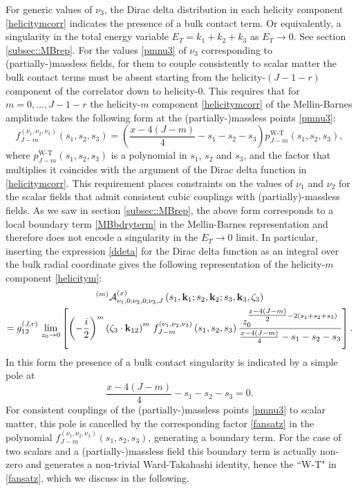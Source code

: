 \documentclass[11pt,a4paper]{article}
\begin{document}
For generic values of $\nu_3$, the Dirac delta distribution in each helicity component \eqref{helicitymcorr} indicates the presence of a bulk contact term. Or equivalently, a singularity in the total energy variable $E_T = k_1+k_2+k_3$ as $E_T \to 0$. See section \ref{subsec::MBrep}. For the values \eqref{pmnu3} of $\nu_3$ corresponding to (partially-)massless fields, for them to couple consistently to scalar matter the bulk contact terms must be absent starting from the helicity-$\left(J-1-r\right)$ component of the correlator down to helicity-$0$. This requires that for $m=0,\ldots,J-1-r$ the helicity-$m$ component \eqref{helicitymcorr} of the Mellin-Barnes amplitude takes the following form at the (partially-)massless points \eqref{pmnu3}:
\begin{equation}\label{fansatz}
  f^{\left(\nu_1,\nu_2,\nu_3\right)}_{J-m}\left(s_1,s_2,s_3\right)=  \left(\frac{x-4\left(J-m\right)}{4}-s_1-s_2-s_3\right)p^{\text{W-T}}_{J-m}\left(s_1,s_2,s_3\right),
\end{equation}
 where $p^{\text{W-T}}_{J-m}\left(s_1,s_2,s_3\right)$ is a polynomial in $s_1$, $s_2$ and $s_3$, and the factor that multiplies it coincides with the argument of the Dirac delta function in \eqref{helicitymcorr}. This requirement places constraints on the values of $\nu_1$ and $\nu_2$ for the scalar fields that admit consistent cubic couplings with (partially)-massless fields. As we saw in section \ref{subsec::MBrep}, the above form corresponds to a local boundary term \eqref{MBbdryterm} in the Mellin-Barnes representation and therefore does not encode a singularity in the $E_T \to 0$ limit. In particular, inserting the expression \eqref{ddeta} for the Dirac delta function as an integral over the bulk radial coordinate gives the following representation of the helicity-$m$ component \eqref{helicitym}:
 \begin{multline}\label{helmeta}
     {}^{\left(m\right)}{\cal A}^{\left(x\right)}_{\nu_1,0;\nu_2,0;\nu_3,J}\left(s_1,{\bf k}_1;s_2,{\bf k}_2;s_3,{\bf k}_3,\zeta_3\right) \\ = g^{\left(J, r\right)}_{12}\,\lim_{z_0 \to 0}\left[ \left(-\frac{i}{2}\right)^m \left(\zeta_3 \cdot {\bf k}_{12}\right)^m\,f^{\left(\nu_1,\nu_2,\nu_3\right)}_{J-m}\left(s_1,s_2,s_3\right) \frac{z_0^{\tfrac{x-4\left(J-m\right)}{2}-2\left(s_1+s_2+s_3\right)}}{\tfrac{x-4\left(J-m\right)}{4}-s_1-s_2-s_3}\right].
 \end{multline}
In this form the presence of a bulk contact singularity is indicated by a simple pole at
\begin{equation}\label{helmconstr}
    \frac{x-4\left(J-m\right)}{4}-s_1-s_2-s_3 = 0.
\end{equation}
For consistent couplings of the (partially-)massless points \eqref{pmnu3} to scalar matter, this pole is cancelled by the corresponding factor \eqref{fansatz} in the polynomial $f^{\left(\nu_1,\nu_2,\nu_3\right)}_{J-m}\left(s_1,s_2,s_3\right)$, generating a boundary term. For the case of two scalars and a (partially-)massless field this boundary term is actually non-zero and generates a non-trivial Ward-Takahashi identity, hence the ``W-T" in \eqref{fansatz}, which we discuss in the following. 
 
\end{document}
